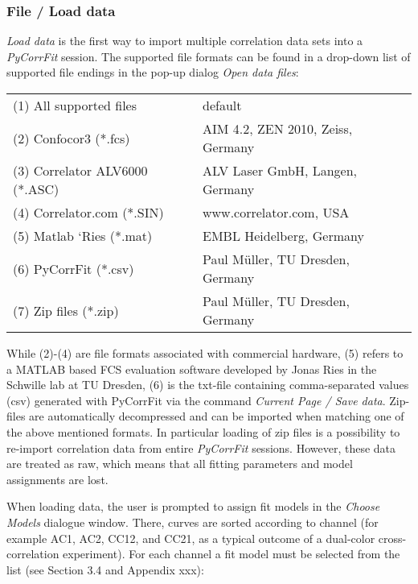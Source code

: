 \subsubsection{File / Load data}
\label{sec:fm.ld}
\textit{Load data }is the first way to import multiple correlation data sets into a \textit{PyCorrFit} session. The supported file formats can be found in a drop-down list of supported file endings in the pop-up dialog \textit{Open data files}:


\begin{tabular}{l l}
 \rule{0pt}{3ex}  (1) All supported files & default \\
 \rule{0pt}{3ex} (2) Confocor3 (*.fcs) & AIM 4.2, ZEN 2010, Zeiss, Germany \\
 \rule{0pt}{3ex} (3) Correlator ALV6000 (*.ASC) & ALV Laser GmbH, Langen, Germany \\
 \rule{0pt}{3ex} (4) Correlator.com (*.SIN) & www.correlator.com, USA \\
 \rule{0pt}{3ex} (5) Matlab ‘Ries (*.mat) & EMBL Heidelberg, Germany \\
 \rule{0pt}{3ex} (6) PyCorrFit (*.csv) & Paul Müller, TU Dresden, Germany \\
 \rule{0pt}{3ex} (7) Zip files (*.zip) & Paul Müller, TU Dresden, Germany \\
\end{tabular}
\vspace{3ex}
\newline
While (2)-(4) are file formats associated with commercial hardware, (5) refers to a MATLAB based FCS evaluation software developed by Jonas Ries in the Schwille lab at TU Dresden, (6) is the txt-file containing comma-separated values (csv) generated with PyCorrFit via the command \textit{Current Page / Save data}. Zip-files are automatically decompressed and can be imported when matching one of the above mentioned formats. In particular loading of zip files is a possibility to re-import correlation data from entire \textit{PyCorrFit} sessions. However, these data are treated as raw, which means that all fitting parameters and model assignments are lost.

When loading data, the user is prompted to assign fit models in the \textit{Choose Models} dialogue window. There, curves are sorted according to channel (for example AC1, AC2, CC12, and CC21, as a typical outcome of a dual-color cross-correlation experiment). For each channel a fit model must be selected from the list (see Section 3.4 and Appendix xxx):

